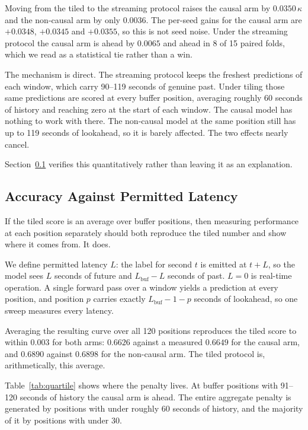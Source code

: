 \documentclass[conference]{IEEEtran}
\begin{document}
Moving from the tiled to the streaming protocol raises the causal arm by $0.0350\,\kappa$ and the
non-causal arm by only $0.0036$. The per-seed gains for the causal arm are $+0.0348$, $+0.0345$ and
$+0.0355$, so this is not seed noise. Under the streaming protocol the causal arm is ahead by
$0.0065$ and ahead in 8 of 15 paired folds, which we read as a statistical tie rather than a win.

The mechanism is direct. The streaming protocol keeps the freshest predictions of each window, which
carry 90--119 seconds of genuine past. Under tiling those same predictions are scored at every buffer
position, averaging roughly 60 seconds of history and reaching zero at the start of each window. The
causal model has nothing to work with there. The non-causal model at the same position still has up to
119 seconds of lookahead, so it is barely affected. The two effects nearly cancel.

Section~\ref{sec:latency} verifies this quantitatively rather than leaving it as an explanation.

\subsection{Accuracy Against Permitted Latency}
\label{sec:latency}

If the tiled score is an average over buffer positions, then measuring performance at each position
separately should both reproduce the tiled number and show where it comes from. It does.

We define permitted latency $L$: the label for second $t$ is emitted at $t + L$, so the model sees $L$
seconds of future and $L_{\text{buf}} - L$ seconds of past. $L = 0$ is real-time operation. A single
forward pass over a window yields a prediction at every position, and position $p$ carries exactly
$L_{\text{buf}} - 1 - p$ seconds of lookahead, so one sweep measures every latency.

Averaging the resulting curve over all 120 positions reproduces the tiled score to within $0.003$ for
both arms: $0.6626$ against a measured $0.6649$ for the causal arm, and $0.6890$ against $0.6898$ for
the non-causal arm. The tiled protocol is, arithmetically, this average.

Table~\ref{tab:quartile} shows where the penalty lives. At buffer positions with 91--120 seconds of
history the causal arm is ahead. The entire aggregate penalty is generated by positions with under
roughly 60 seconds of history, and the majority of it by positions with under 30.
\end{document}
